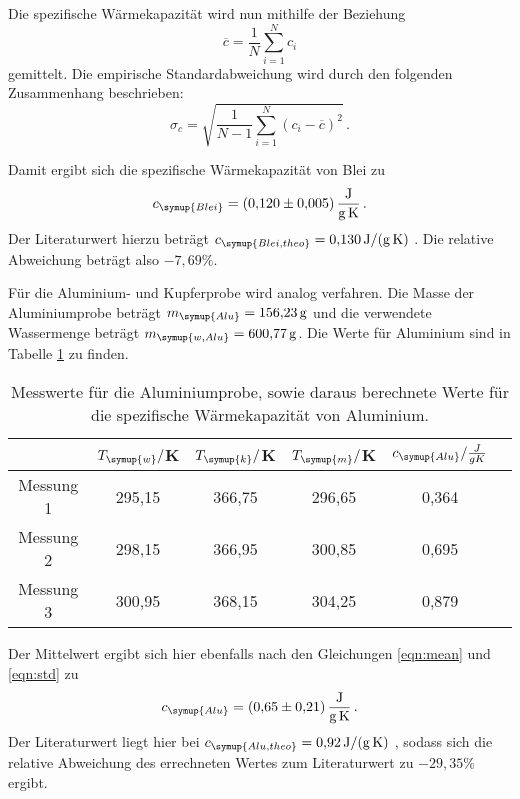 Die spezifische Wärmekapazität wird nun mithilfe der Beziehung
\begin{equation}
  \overline{c} = \frac{1}{N}\sum\limits_{i = 1}^N c_i
  \label{eqn:mean}
\end{equation}
gemittelt. Die empirische Standardabweichung wird durch den folgenden Zusammenhang
beschrieben:
\begin{equation}
  \sigma_c = \sqrt{\frac{1}{N-1}
    \sum\limits_{i = 1}^N
    (c_i-\overline{c})^2} \,.
    \label{eqn:std}
\end{equation}

Damit ergibt sich die spezifische Wärmekapazität von Blei zu
\begin{equation}
  c_{\symup{Blei}} = \SI{0.120(0005)}{\joule\per\gram\per\kelvin} \,.\nonumber
\end{equation}
Der Literaturwert hierzu beträgt $c_{\symup{Blei,theo}}=\SI{0.130}{\joule\per\gram\per\kelvin}$ \cite{werte}.
Die relative Abweichung beträgt also $-7,69\%$.

Für die Aluminium- und Kupferprobe wird analog verfahren. Die Masse der Aluminiumprobe
beträgt $m_{\symup{Alu}}=\SI{156.23}{\gram}$ und die verwendete Wassermenge
beträgt $m_{\symup{w,Alu}}=\SI{600.77}{\gram}$. Die Werte für Aluminium sind in
Tabelle \ref{tab:alu} zu finden.

\begin{table}
  \centering
  \caption{Messwerte für die Aluminiumprobe, sowie daraus berechnete Werte für die spezifische
  Wärmekapazität von Aluminium.}
  \label{tab:alu}
  \begin{tabular}{c c c c c c}
    \toprule
    & $T_{\symup{w}}/$K & $T_{\symup{k}}/$K & $T_{\symup{m}}/$K & $c_{\symup{Alu}}/\frac{J}{g K}$ \\
    \midrule
    Messung 1 & 295,15 & 366,75 & 296,65 & 0,364 \\
    Messung 2 & 298,15 & 366,95 & 300,85 & 0,695 \\
    Messung 3 & 300,95 & 368,15 & 304,25 & 0,879 \\
    \bottomrule
  \end{tabular}
\end{table}

Der Mittelwert ergibt sich hier ebenfalls nach den Gleichungen \eqref{eqn:mean} und
\eqref{eqn:std} zu
\begin{equation}
  c_{\symup{Alu}} = \SI{0.65(021)}{\joule\per\gram\per\kelvin} \,.\nonumber
\end{equation}
Der Literaturwert liegt hier bei $c_{\symup{Alu,theo}}=\SI{0.92}{\joule\per\gram\per\kelvin}$ \cite{werte},
sodass sich die relative Abweichung des errechneten Wertes zum Literaturwert zu
$-29,35\%$ ergibt.


